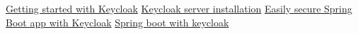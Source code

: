 \documentclass{article}
\begin{document}


\begin{thebibliography}{4}

     \href{https://www.keycloak.org/docs/11.0/getting_started/}{Getting started with Keycloak}
     \href{https://www.keycloak.org/docs/latest/server_installation/}{Keycloak server installation}
     \href{https://www.keycloak.org/2017/05/easily-secure-your-spring-boot.html}{Easily secure Spring Boot app with Keycloak}
     \href{https://www.baeldung.com/spring-boot-keycloak}{Spring boot with keycloak}

\end{thebibliography}


\pagebreak






\end{document}
